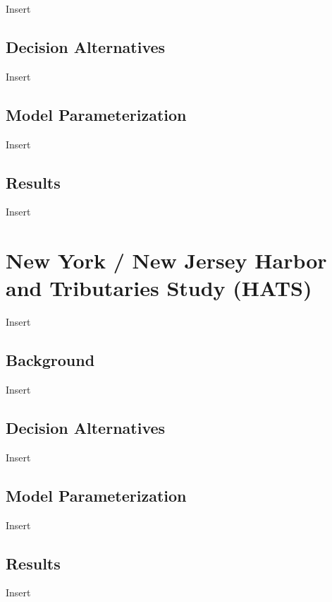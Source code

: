 \documentclass[
]{book}
\begin{document}
Insert

\hypertarget{decision-alternatives}{%
\section{Decision Alternatives}\label{decision-alternatives}}

Insert

\hypertarget{model-parameterization}{%
\section{Model Parameterization}\label{model-parameterization}}

Insert

\hypertarget{results}{%
\section{Results}\label{results}}

Insert

\hypertarget{new-york-new-jersey-harbor-and-tributaries-study-hats}{%
\chapter{New York / New Jersey Harbor and Tributaries Study (HATS)}\label{new-york-new-jersey-harbor-and-tributaries-study-hats}}

Insert

\hypertarget{background-1}{%
\section{Background}\label{background-1}}

Insert

\hypertarget{decision-alternatives-1}{%
\section{Decision Alternatives}\label{decision-alternatives-1}}

Insert

\hypertarget{model-parameterization-1}{%
\section{Model Parameterization}\label{model-parameterization-1}}

Insert

\hypertarget{results-1}{%
\section{Results}\label{results-1}}

Insert

  
\end{document}
